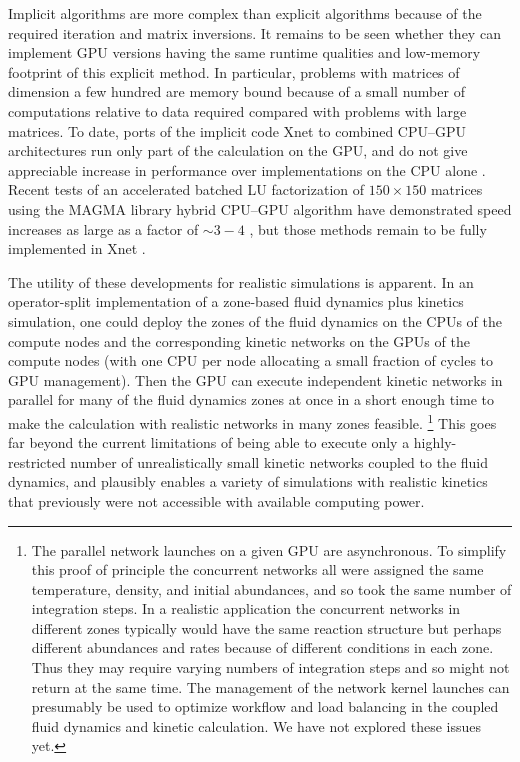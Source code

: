 \documentclass[]{elsart}
\begin{document}
Implicit algorithms are more complex than explicit algorithms because of the
required iteration and matrix inversions. It remains to be seen whether
they can implement GPU versions having the same runtime qualities and
low-memory footprint of this explicit method.
In particular, problems with matrices of dimension a few hundred are memory 
bound  
because of a 
small number of computations relative to data required compared with problems 
with large matrices.  To date, ports of the implicit code Xnet \cite{raphcode} 
to combined CPU--GPU architectures run only part of the calculation on the GPU, 
and do not give appreciable increase in performance over implementations on the 
CPU alone \cite{harrisPrivate}.  Recent tests of an accelerated batched LU 
factorization of  $150 \times 150$ matrices using the MAGMA library 
hybrid CPU--GPU algorithm have demonstrated speed increases as large as a 
factor of $\sim 3-4$ \cite{dong2014}, but those methods remain to be fully 
implemented in Xnet \cite{harrisPrivate}.


The utility of these developments for realistic simulations is apparent.  In an
operator-split implementation of a zone-based fluid dynamics plus kinetics 
simulation, one could deploy the zones of the fluid dynamics on the CPUs of the 
compute nodes and the corresponding kinetic networks on the GPUs of the compute 
nodes (with one CPU per node allocating a small fraction of cycles to GPU 
management).  Then the GPU can execute independent kinetic networks in parallel 
for many of the fluid dynamics zones at once in a short enough time to make the 
calculation with realistic networks in many zones feasible.%
%
%
\footnote{
The parallel network launches on a given GPU are asynchronous.  To simplify this 
proof of principle the concurrent networks all were assigned the same 
temperature, density, and initial abundances, and so took the same number of 
integration steps. In a realistic application the concurrent networks in 
different zones typically would have the same reaction structure but perhaps 
different abundances and rates because of different conditions in each zone.  
Thus they may require varying numbers of integration steps and so might not 
return at the same time. The management of the network kernel launches can 
presumably be used to optimize workflow and load balancing in the coupled fluid 
dynamics and kinetic calculation.  We have not explored these issues yet. }
%
%
This goes far beyond the current limitations of being able to execute only 
a highly-restricted number of unrealistically small kinetic networks coupled to 
the fluid dynamics, and plausibly enables a variety of simulations with 
realistic kinetics that previously were  not accessible with available 
computing power.
\end{document}
